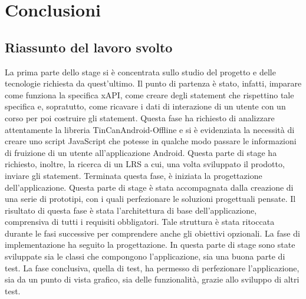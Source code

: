 \documentclass[../Tesi.tex]{subfiles}
\begin{document}
\section{Conclusioni}
	\subsection{Riassunto del lavoro svolto}
	La prima parte dello stage si è concentrata sullo studio del progetto e delle tecnologie richiesta da quest'ultimo. Il punto di partenza è stato, infatti, imparare come funziona la specifica xAPI, come creare degli statement che rispettino tale specifica e, sopratutto, come ricavare i dati di interazione di un utente con un corso per poi costruire gli statement. Questa fase ha richiesto di analizzare attentamente la libreria TinCanAndroid-Offline e si è evidenziata la necessità di creare uno script JavaScript che potesse in qualche modo passare le informazioni di fruizione di un utente all'applicazione Android. Questa parte di stage ha richiesto, inoltre, la ricerca di un LRS a cui, una volta sviluppato il prodotto, inviare gli statement. Terminata questa fase, è iniziata la progettazione dell'applicazione. Questa parte di stage è stata accompagnata dalla creazione di una serie di prototipi, con i quali perfezionare le soluzioni progettuali pensate. Il risultato di questa fase è stata l'architettura di base dell'applicazione, comprensiva di tutti i requisiti obbligatori. Tale struttura è stata ritoccata durante le fasi successive per comprendere anche gli obiettivi opzionali. La fase di implementazione ha seguito la progettazione. In questa parte di stage sono state sviluppate sia le classi che compongono l'applicazione, sia una buona parte di test. La fase conclusiva, quella di test, ha permesso di perfezionare l'applicazione, sia da un punto di vista grafico, sia delle funzionalità, grazie allo sviluppo di altri test.\\
\end{document}
